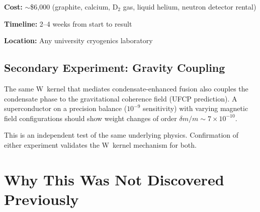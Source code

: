\documentclass[11pt, a4paper]{article}
\begin{document}
\textbf{Cost:} $\sim$\$6{,}000 (graphite, calcium, D$_2$ gas,
liquid helium, neutron detector rental)

\textbf{Timeline:} 2--4 weeks from start to result

\textbf{Location:} Any university cryogenics laboratory

\subsection{Secondary Experiment: Gravity Coupling}

The same W~kernel that mediates condensate-enhanced fusion
also couples the condensate phase to the gravitational
coherence field (UFCP prediction). A superconductor on a
precision balance ($10^{-9}$ sensitivity) with varying magnetic
field configurations should show weight changes of order
$\delta m/m \sim 7 \times 10^{-10}$.

This is an independent test of the same underlying physics.
Confirmation of either experiment validates the W~kernel
mechanism for both.

\section{Why This Was Not Discovered Previously}
\end{document}
